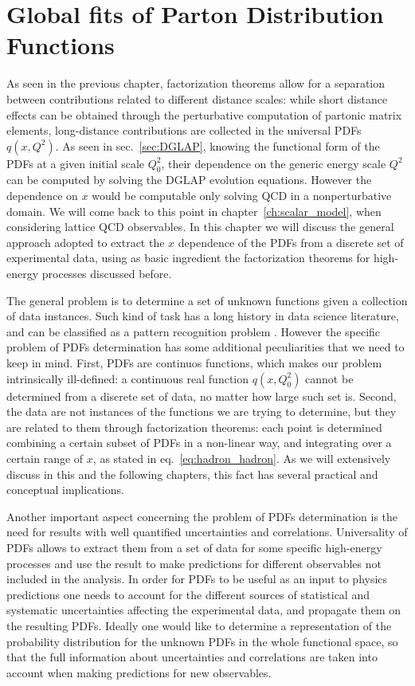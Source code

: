 \chapter{Global fits of Parton Distribution Functions} 
\label{ch:nnpdf_methodology}
As seen in the previous chapter, factorization theorems allow for a separation between contributions 
related to different distance scales: while short distance
effects can be obtained through the perturbative computation of partonic matrix elements, 
long-distance contributions are collected in the universal PDFs $q\left(x,Q^2\right)$. As seen in sec.~\ref{sec:DGLAP},
knowing the functional form of the PDFs at a given initial scale $Q_0^2$, 
their dependence on the generic energy scale $Q^2$ can be computed by solving the DGLAP evolution equations.
However the dependence on $x$ would be computable only solving QCD in a nonperturbative domain.
We will come back to 
this point in chapter~\ref{ch:scalar_model}, when considering lattice QCD observables.
In this chapter we will discuss the general approach adopted to extract the $x$ dependence of the PDFs
from a discrete set of experimental data, using as basic ingredient the factorization theorems for high-energy processes
discussed before.

%
The general problem is to determine a set of unknown functions given
a collection of data instances. Such kind of task has a long history in data science literature, 
and can be classified as a pattern recognition problem \cite{Forte:2020yip}.
However the specific problem of PDFs determination has some additional peculiarities that we need to keep in mind.
First, PDFs are continuos functions, which makes our problem intrinsically ill-defined: a continuous real function
$q\left(x,Q_0^2\right)$ cannot be determined from a discrete set of data, no matter how large such set is.
Second, the data are not instances of the functions we are trying to determine, but they are related to 
them through factorization theorems: each point is determined combining a certain subset of PDFs in a non-linear way,
and integrating over a certain range of $x$, as stated in eq.~\eqref{eq:hadron_hadron}. 
As we will extensively discuss in this and the following chapters,
this fact has several practical and conceptual implications.

%
Another important aspect concerning the problem of PDFs determination 
is the need for results with well quantified uncertainties and correlations.
Universality of PDFs allows to extract them from a set of data for some specific high-energy processes
and use the result to make predictions for different observables not included in the analysis.
In order for PDFs to be useful as an input to physics predictions one needs to account for the different
sources of statistical and systematic uncertainties affecting the experimental data, and
propagate them on the resulting PDFs.
Ideally one would like to determine a representation 
of the probability distribution for the unknown PDFs in the whole functional space, so that the full information
about uncertainties and correlations are taken into account when making predictions for new observables.

